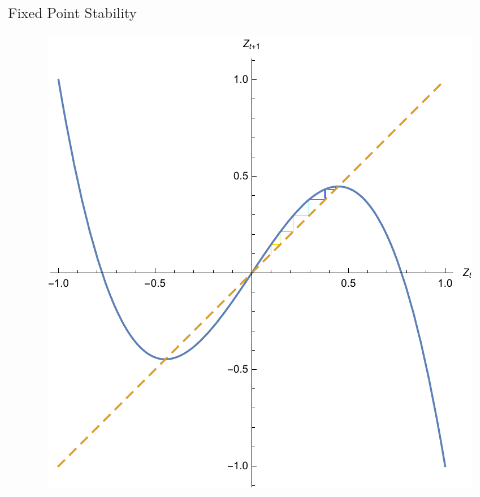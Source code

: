 \documentclass{beamer}
\begin{document}
\begin{frame}{Fixed Point Stability}
	\begin{figure}
		\centering
		\includegraphics[height=\textheight]{fixed_point.pdf}
	\end{figure}
\end{frame}
\end{document}
